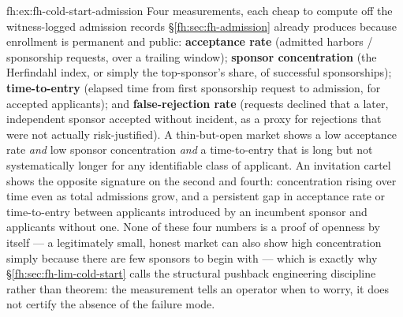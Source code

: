 \begin{pdSolution}{fh:ex:fh-cold-start-admission}
Four measurements, each cheap to compute off the witness-logged admission records \S\ref{fh:sec:fh-admission} already produces because enrollment is permanent and public: \textbf{acceptance rate} (admitted harbors / sponsorship requests, over a trailing window); \textbf{sponsor concentration} (the Herfindahl index, or simply the top-sponsor's share, of successful sponsorships); \textbf{time-to-entry} (elapsed time from first sponsorship request to admission, for accepted applicants); and \textbf{false-rejection rate} (requests declined that a later, independent sponsor accepted without incident, as a proxy for rejections that were not actually risk-justified). A thin-but-open market shows a low acceptance rate \emph{and} low sponsor concentration \emph{and} a time-to-entry that is long but not systematically longer for any identifiable class of applicant. An invitation cartel shows the opposite signature on the second and fourth: concentration rising over time even as total admissions grow, and a persistent gap in acceptance rate or time-to-entry between applicants introduced by an incumbent sponsor and applicants without one. None of these four numbers is a proof of openness by itself --- a legitimately small, honest market can also show high concentration simply because there are few sponsors to begin with --- which is exactly why \S\ref{fh:sec:fh-lim-cold-start} calls the structural pushback engineering discipline rather than theorem: the measurement tells an operator when to worry, it does not certify the absence of the failure mode.
\end{pdSolution}
